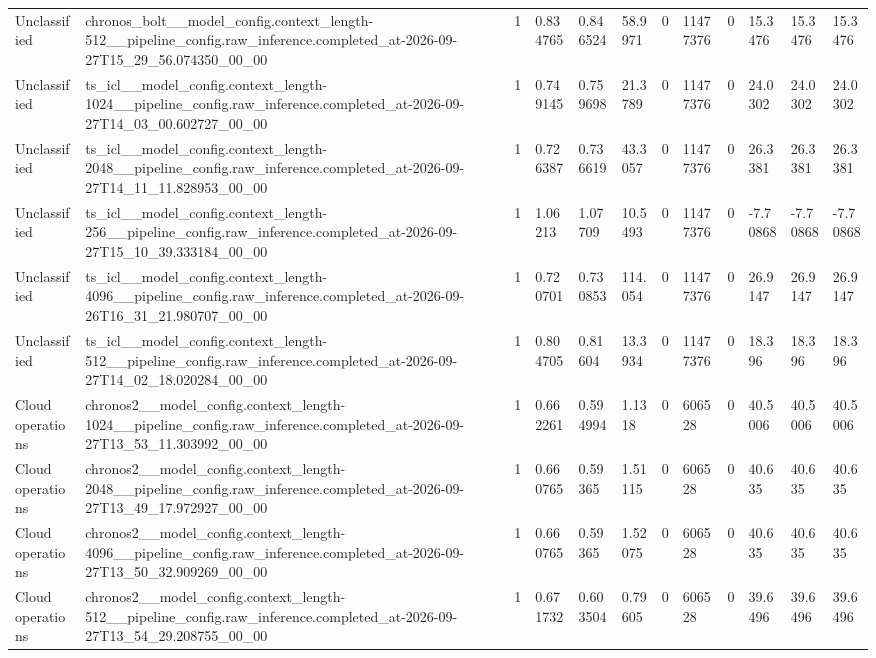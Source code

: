 \begin{tabular}{llllllllllll}
Unclassified & chronos\_bolt\_\_model\_config.context\_length-512\_\_pipeline\_config.raw\_inference.completed\_at-2026-09-27T15\_29\_56.074350\_00\_00 & 1 & 0.834765 & 0.846524 & 58.9971 & 0 & 11477376 & 0 & 15.3476 & 15.3476 & 15.3476 \\
Unclassified & ts\_icl\_\_model\_config.context\_length-1024\_\_pipeline\_config.raw\_inference.completed\_at-2026-09-27T14\_03\_00.602727\_00\_00 & 1 & 0.749145 & 0.759698 & 21.3789 & 0 & 11477376 & 0 & 24.0302 & 24.0302 & 24.0302 \\
Unclassified & ts\_icl\_\_model\_config.context\_length-2048\_\_pipeline\_config.raw\_inference.completed\_at-2026-09-27T14\_11\_11.828953\_00\_00 & 1 & 0.726387 & 0.736619 & 43.3057 & 0 & 11477376 & 0 & 26.3381 & 26.3381 & 26.3381 \\
Unclassified & ts\_icl\_\_model\_config.context\_length-256\_\_pipeline\_config.raw\_inference.completed\_at-2026-09-27T15\_10\_39.333184\_00\_00 & 1 & 1.06213 & 1.07709 & 10.5493 & 0 & 11477376 & 0 & -7.70868 & -7.70868 & -7.70868 \\
Unclassified & ts\_icl\_\_model\_config.context\_length-4096\_\_pipeline\_config.raw\_inference.completed\_at-2026-09-26T16\_31\_21.980707\_00\_00 & 1 & 0.720701 & 0.730853 & 114.054 & 0 & 11477376 & 0 & 26.9147 & 26.9147 & 26.9147 \\
Unclassified & ts\_icl\_\_model\_config.context\_length-512\_\_pipeline\_config.raw\_inference.completed\_at-2026-09-27T14\_02\_18.020284\_00\_00 & 1 & 0.804705 & 0.81604 & 13.3934 & 0 & 11477376 & 0 & 18.396 & 18.396 & 18.396 \\
Cloud operations & chronos2\_\_model\_config.context\_length-1024\_\_pipeline\_config.raw\_inference.completed\_at-2026-09-27T13\_53\_11.303992\_00\_00 & 1 & 0.662261 & 0.594994 & 1.1318 & 0 & 606528 & 0 & 40.5006 & 40.5006 & 40.5006 \\
Cloud operations & chronos2\_\_model\_config.context\_length-2048\_\_pipeline\_config.raw\_inference.completed\_at-2026-09-27T13\_49\_17.972927\_00\_00 & 1 & 0.660765 & 0.59365 & 1.51115 & 0 & 606528 & 0 & 40.635 & 40.635 & 40.635 \\
Cloud operations & chronos2\_\_model\_config.context\_length-4096\_\_pipeline\_config.raw\_inference.completed\_at-2026-09-27T13\_50\_32.909269\_00\_00 & 1 & 0.660765 & 0.59365 & 1.52075 & 0 & 606528 & 0 & 40.635 & 40.635 & 40.635 \\
Cloud operations & chronos2\_\_model\_config.context\_length-512\_\_pipeline\_config.raw\_inference.completed\_at-2026-09-27T13\_54\_29.208755\_00\_00 & 1 & 0.671732 & 0.603504 & 0.79605 & 0 & 606528 & 0 & 39.6496 & 39.6496 & 39.6496 \\

\end{tabular}
